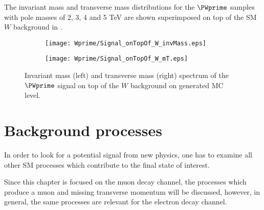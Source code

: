 The invariant mass and transverse mass distributions for the $\PWprime$ samples with pole masses of 2, 3, 4 and 5 TeV are shown superimposed on top of the SM $W$ background in .

\begin{figure}
\begin{subfigure}{.5\textwidth}
  \centering
  \texttt{[image: Wprime/Signal\_onTopOf\_W\_invMass.eps]}
\end{subfigure}%
\begin{subfigure}{.5\textwidth}
  \centering
  \texttt{[image: Wprime/Signal\_onTopOf\_W\_mT.eps]}
\end{subfigure}
\caption{Invariant mass (left) and transverse mass (right) spectrum of the $\PWprime$ signal on top of the $W$ background on generated MC level.}
  \label{fig:signal_with_W}
\end{figure}



\section{Background processes}
\label{sec:wprimeBackgrounds}

In order to look for a potential signal from  new physics, one has to examine all other SM processes which contribute to the final state of interest.


Since this chapter is focused on the muon decay channel, the processes which produce a muon and missing transverse momentum will be discussed, 
however, in general, the same processes are relevant for the electron decay channel.

